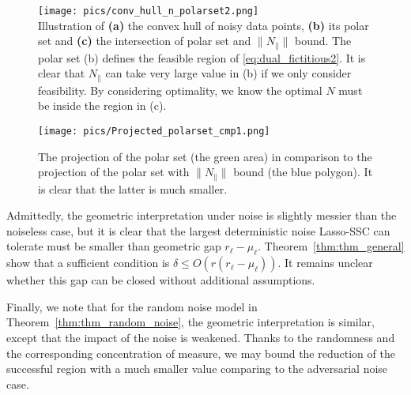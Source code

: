 \documentclass[12pt,heading]{ctexbook}
\begin{document}
\begin{figure}
  \centering
    \texttt{[image: pics/conv\_hull\_n\_polarset2.png]}\\
  \caption{Illustration of \textbf{(a)} the convex hull of noisy data points, \textbf{(b)} its polar set and \textbf{(c)} the intersection of polar set and $\|N_{\parallel}\|$ bound. The polar set (b) defines the feasible region of \eqref{eq:dual_fictitious2}. It is clear that $N_{\parallel}$ can take very large value in (b) if we only consider feasibility. By considering optimality, we know the optimal $N$ must be inside the region in (c).} \label{fig.convex_hull_n_polar}
    \texttt{[image: pics/Projected\_polarset\_cmp1.png]}\\
  \caption{The projection of the polar set (the green area) in comparison to the projection of the polar set with $\|N_{\parallel}\|$ bound (the blue polygon). It is clear that the latter is much smaller.}\label{fig.ProjPolar}
\end{figure}

Admittedly, the geometric interpretation under noise is slightly messier than the noiseless case, but it is clear that the largest deterministic noise Lasso-SSC can tolerate must be smaller than geometric gap $r_\ell-\mu_\ell$. Theorem~\ref{thm:thm_general} show that a sufficient condition is $\delta \leq O(r(r_\ell-\mu_\ell))$. It remains unclear whether this gap can be closed without additional assumptions.


Finally, we note that for the random noise model in Theorem~\ref{thm:thm_random_noise}, the geometric interpretation is similar, except that the impact of the noise is weakened. Thanks to the randomness and the corresponding concentration of measure, we may bound the reduction of the successful region with a much smaller value comparing to the adversarial noise case.

\end{document}
